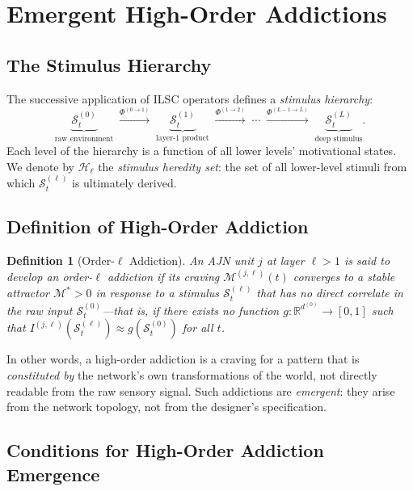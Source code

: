 \documentclass[12pt,a4paper]{article}
\newtheorem{definition}{Definition}
\newcommand{\tens}[1]{\boldsymbol{\mathcal{#1}}}
\newcommand{\R}{\mathbb{R}}
\begin{document}
\section{Emergent High-Order Addictions}
\label{sec:high_order}

\subsection{The Stimulus Hierarchy}

The successive application of ILSC operators defines a \textit{stimulus
hierarchy}:
\[
\underbrace{\tens{S}_t^{(0)}}_{\text{raw environment}}
\;\xrightarrow{\Phi^{(0\to1)}}\;
\underbrace{\tens{S}_t^{(1)}}_{\text{layer-1 product}}
\;\xrightarrow{\Phi^{(1\to2)}}\;
\cdots
\;\xrightarrow{\Phi^{(L-1\to L)}}\;
\underbrace{\tens{S}_t^{(L)}}_{\text{deep stimulus}}.
\]
Each level of the hierarchy is a function of all lower levels' motivational states.
We denote by $\mathcal{H}_\ell$ the \textit{stimulus heredity set}: the set of
all lower-level stimuli from which $\tens{S}_t^{(\ell)}$ is ultimately derived.

\subsection{Definition of High-Order Addiction}

\begin{definition}[Order-$\ell$ Addiction]
\label{def:high_order}
An AJN unit $j$ at layer $\ell > 1$ is said to develop an
\emph{order-$\ell$ addiction} if its craving $\mathcal{M}^{(j,\ell)}(t)$
converges to a stable attractor $\mathcal{M}^* > 0$ in response to a stimulus
$\tens{S}_t^{(\ell)}$ that has no direct correlate in the raw input
$\tens{S}_t^{(0)}$---that is, if there exists no function
$g: \R^{d^{(0)}} \to [0,1]$ such that
$I^{(j,\ell)}(\tens{S}_t^{(\ell)}) \approx g(\tens{S}_t^{(0)})$ for all $t$.
\end{definition}

In other words, a high-order addiction is a craving for a pattern that is
\textit{constituted by} the network's own transformations of the world, not
directly readable from the raw sensory signal. Such addictions are \textit{emergent}:
they arise from the network topology, not from the designer's specification.

\subsection{Conditions for High-Order Addiction Emergence}
\end{document}
